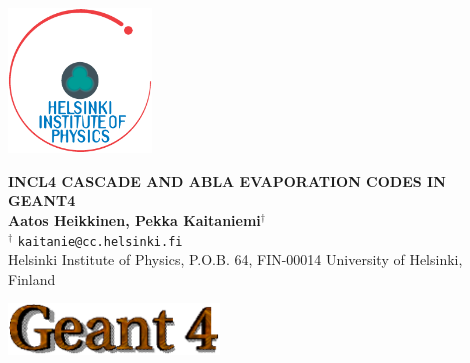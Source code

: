 \documentclass[20pt]{article}
\newlength{\bgwidth}
\newlength{\bgheight}
\begin{document}
\huge
\begin{center}



\vspace{-1in}
	\parbox[c]{1.4cm}{\includegraphics[width=3.8cm]{images/hiplogo.eps}}
	\hspace{0.6cm}
   \parbox[c]{0.8\linewidth}{
		\begin{center}
			\textbf{\Huge {\sf INCL4} CASCADE AND {\sf ABLA} EVAPORATION CODES IN {\sf GEANT4}} \\[0.5em]
			\textbf{\LARGE Aatos Heikkinen, Pekka Kaitaniemi$^{\dagger}$} \\[0.3em]
			{\Large $^{\dagger}$ {\tt kaitanie@cc.helsinki.fi}} \\
                        {\textsc Helsinki Institute of Physics, P.O.B. 64, FIN-00014 University of Helsinki, Finland}
                        \vskip2cm
		\end{center}
	}
	\parbox[c]{5.3cm}{\hspace{-1.0cm} \includegraphics[width=5.6cm]{images/g4logo.eps}}


\end{center}
\end{document}
